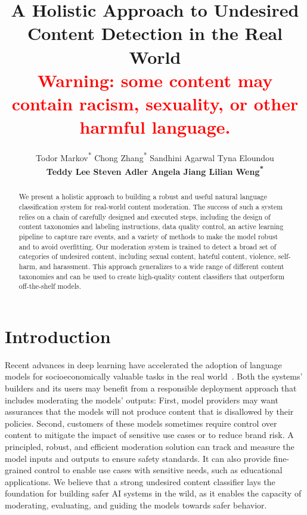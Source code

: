 \documentclass[letterpaper]{article} %
\title{
A Holistic Approach to Undesired Content Detection in the Real World\\
\normalsize{\textnormal{\textcolor{red}{Warning: some content may contain racism, sexuality, or other harmful language.}}}
}
\author{
Todor Markov\textsuperscript{*} \quad Chong Zhang\textsuperscript{*} \quad Sandhini Agarwal \quad Tyna Eloundou \\
{\bf Teddy Lee \quad Steven Adler \quad Angela Jiang \quad Lilian Weng\textsuperscript{*}}
}
\begin{document}
\maketitle

\def\thefootnote{*}\def\thefootnote{\arabic{footnote}}

\begin{abstract}
We present a holistic approach to building a robust and useful natural language classification system for real-world content moderation. The success of such a system relies on a chain of carefully designed and executed steps, including the design of content taxonomies and labeling instructions, data quality control, an active learning pipeline to capture rare events, and a variety of methods to make the model robust and to avoid overfitting. Our moderation system is trained to detect a broad set of categories of undesired content, including sexual content, hateful content, violence, self-harm, and harassment. This approach generalizes to a wide range of different content taxonomies and can be used to create high-quality content classifiers that outperform off-the-shelf models.

\end{abstract}

\section{Introduction}


Recent advances in deep learning have accelerated the adoption of language models for socioeconomically valuable tasks in the real world~\cite{BERT,gpt3,lamda2022}. 
%
Both the systems' builders and its users may benefit from a responsible deployment approach that includes moderating the models' outputs: First, model providers may want assurances that the models will not produce content that is disallowed by their policies. Second, customers of these models sometimes require control over content to mitigate the impact of sensitive use cases or to reduce brand risk. 
%
A principled, robust, and efficient moderation solution can track and measure the model inputs and outputs to ensure safety standards. It can also provide fine-grained control to enable use cases with sensitive needs, such as educational applications. We believe that a strong undesired content classifier lays the foundation for building safer AI systems in the wild, as it enables the capacity of moderating, evaluating, and guiding the models towards safer behavior.
\end{document}
